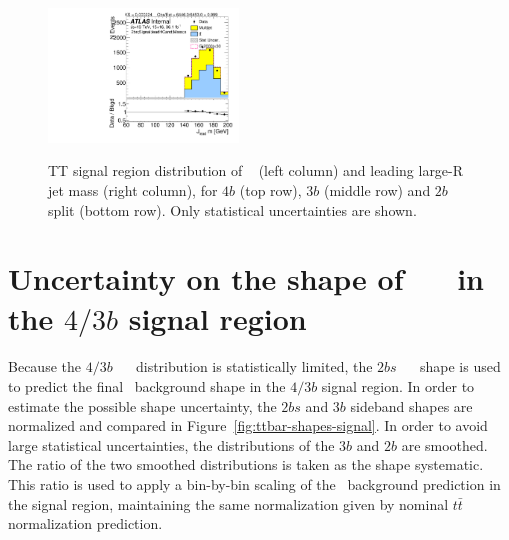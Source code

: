 \begin{figure}[htbp!]
\begin{center}
\includegraphics[width=0.45\textwidth,angle=-90]{figures/boosted/TT/Moriond_TT_TwoTag_split_Signal_leadHCand_Mass_s.pdf}\\
\end{center}
\caption{TT signal region distribution of \mtwoJ~ (left column) and leading large-R jet mass (right column), for $4b$ (top row), $3b$ (middle row) and $2b$ split (bottom row). Only statistical uncertainties are shown.}
\label{CRSB:TTSR_Distribution}
\end{figure}


\clearpage
\section{Uncertainty on the shape of \ttbar\ \mtwoJ~ in the $4/3b$ signal region}
\label{sec:unc-shape-ttbar-in-sr}

\paragraph{}
Because the $4/3b$ \ttbar\ \mtwoJ~ distribution is statistically limited, the $2bs$ \ttbar\ \mtwoJ~ shape is used to predict the final \ttbar\ background shape in the $4/3b$ signal region.
In order to estimate the possible shape uncertainty, the $2bs$ and $3b$ sideband shapes are normalized and compared in Figure~\ref{fig:ttbar-shapes-signal}.  
In order to avoid large statistical uncertainties, the distributions of the $3b$ and $2b$ are smoothed. 
The ratio of the two smoothed distributions is taken as the shape systematic. 
This ratio is used to apply a bin-by-bin scaling of the \ttbar\ background prediction in the signal region, maintaining the same normalization given by nominal $t\bar{t}$ normalization prediction.

